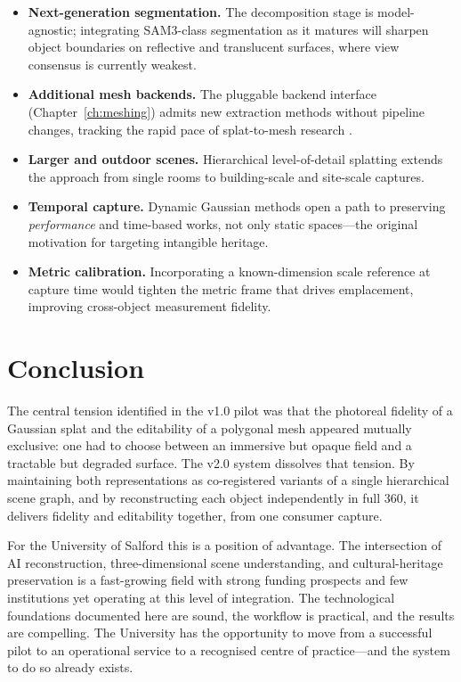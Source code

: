 \begin{itemize}
  \item \textbf{Next-generation segmentation.} The decomposition stage is model-agnostic; integrating SAM3-class segmentation as it matures will sharpen object boundaries on reflective and translucent surfaces, where view consensus is currently weakest.

  \item \textbf{Additional mesh backends.} The pluggable backend interface (Chapter~\ref{ch:meshing}) admits new extraction methods without pipeline changes, tracking the rapid pace of splat-to-mesh research \parencite{Guedon2025MILo,Radl2025CoMe}.

  \item \textbf{Larger and outdoor scenes.} Hierarchical level-of-detail splatting \parencite{Kerbl2024Hierarchical} extends the approach from single rooms to building-scale and site-scale captures.

  \item \textbf{Temporal capture.} Dynamic Gaussian methods \parencite{Luiten2024Dynamic} open a path to preserving \emph{performance} and time-based works, not only static spaces---the original motivation for targeting intangible heritage.

  \item \textbf{Metric calibration.} Incorporating a known-dimension scale reference at capture time would tighten the metric frame that drives emplacement, improving cross-object measurement fidelity.
\end{itemize}

\section{Conclusion}
\label{sec:road-conclusion}

The central tension identified in the v1.0 pilot was that the photoreal fidelity of a Gaussian splat and the editability of a polygonal mesh appeared mutually exclusive: one had to choose between an immersive but opaque field and a tractable but degraded surface. The v2.0 system dissolves that tension. By maintaining both representations as co-registered variants of a single hierarchical scene graph, and by reconstructing each object independently in full 360\textdegree, it delivers fidelity and editability together, from one consumer capture.

For the University of Salford this is a position of advantage. The intersection of AI reconstruction, three-dimensional scene understanding, and cultural-heritage preservation is a fast-growing field with strong funding prospects and few institutions yet operating at this level of integration. The technological foundations documented here are sound, the workflow is practical, and the results are compelling. The University has the opportunity to move from a successful pilot to an operational service to a recognised centre of practice---and the system to do so already exists.
